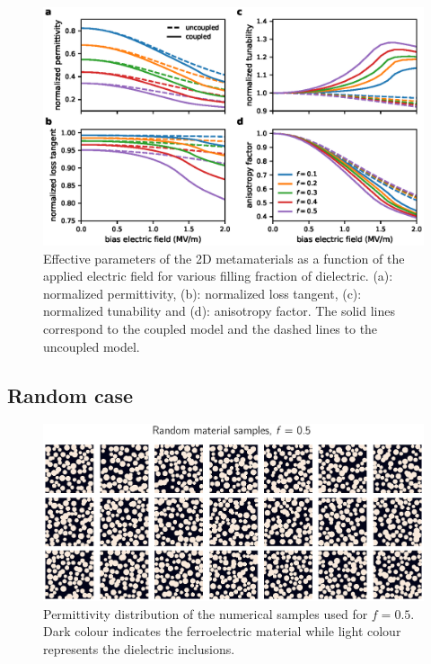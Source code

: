 \documentclass[openacc]{rsproca_new}%
\begin{document}
\begin{figure}[!t]
\centering
\includegraphics[width=1\textwidth]{effpar_per}
\caption{Effective parameters of the 2D metamaterials as a function of the
 applied electric field for various filling fraction of dielectric.
 (a): normalized permittivity, (b): normalized loss tangent, (c): normalized tunability and
 (d): anisotropy factor. The solid lines correspond to the coupled model and
 the dashed lines to the uncoupled model.}
\label{eff_par_2D_TM}
\end{figure}


\subsection{Random case}
\begin{figure}
\centering
\includegraphics[width=0.8\columnwidth]{randmatepsi}
\caption{Permittivity distribution of the numerical samples used for $f=0.5$. Dark
colour indicates the ferroelectric material while light colour represents the
dielectric inclusions.}
\label{randmatepsi}
\end{figure}
\end{document}
